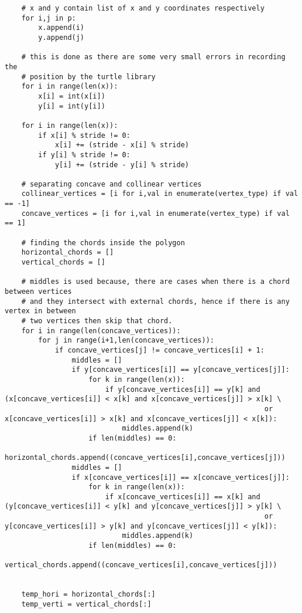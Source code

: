 \begin{lstlisting}
    # x and y contain list of x and y coordinates respectively
    for i,j in p:
        x.append(i)
        y.append(j)

    # this is done as there are some very small errors in recording the 
    # position by the turtle library
    for i in range(len(x)):
        x[i] = int(x[i])
        y[i] = int(y[i])

    for i in range(len(x)):
        if x[i] % stride != 0:
            x[i] += (stride - x[i] % stride)
        if y[i] % stride != 0:
            y[i] += (stride - y[i] % stride)

    # separating concave and collinear vertices
    collinear_vertices = [i for i,val in enumerate(vertex_type) if val == -1]
    concave_vertices = [i for i,val in enumerate(vertex_type) if val == 1]
    
    # finding the chords inside the polygon
    horizontal_chords = []
    vertical_chords = []

    # middles is used because, there are cases when there is a chord between vertices
    # and they intersect with external chords, hence if there is any vertex in between 
    # two vertices then skip that chord. 
    for i in range(len(concave_vertices)):
        for j in range(i+1,len(concave_vertices)):
            if concave_vertices[j] != concave_vertices[i] + 1:
                middles = []
                if y[concave_vertices[i]] == y[concave_vertices[j]]:
                    for k in range(len(x)):
                        if y[concave_vertices[i]] == y[k] and (x[concave_vertices[i]] < x[k] and x[concave_vertices[j]] > x[k] \
                                                              or x[concave_vertices[i]] > x[k] and x[concave_vertices[j]] < x[k]):
                            middles.append(k)
                    if len(middles) == 0:
                        horizontal_chords.append((concave_vertices[i],concave_vertices[j]))
                middles = []
                if x[concave_vertices[i]] == x[concave_vertices[j]]:
                    for k in range(len(x)):
                        if x[concave_vertices[i]] == x[k] and (y[concave_vertices[i]] < y[k] and y[concave_vertices[j]] > y[k] \
                                                              or y[concave_vertices[i]] > y[k] and y[concave_vertices[j]] < y[k]):
                            middles.append(k)
                    if len(middles) == 0:
                        vertical_chords.append((concave_vertices[i],concave_vertices[j]))
            

    temp_hori = horizontal_chords[:]
    temp_verti = vertical_chords[:]


\end{lstlisting}
